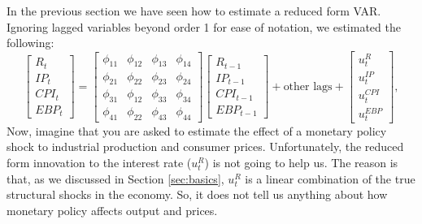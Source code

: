 \documentclass[10pt]{article}
\begin{document}
In the previous section we have seen how to estimate a reduced form VAR.
Ignoring lagged variables beyond order 1 for ease of notation, we estimated
the following:%
\begin{equation}
\begin{bmatrix}
R_{t} \\
IP_{t} \\
CPI_{t} \\
EBP_{t}%
\end{bmatrix}%
=\left[
\begin{array}{cccc}
\phi _{11} & \phi _{12} & \phi _{13} & \phi _{14} \\
\phi _{21} & \phi _{22} & \phi _{23} & \phi _{24} \\
\phi _{31} & \phi _{12} & \phi _{33} & \phi _{34} \\
\phi _{41} & \phi _{22} & \phi _{43} & \phi _{44}%
\end{array}%
\right]
\begin{bmatrix}
R_{t-1} \\
IP_{t-1} \\
CPI_{t-1} \\
EBP_{t-1}%
\end{bmatrix}%
+\text{other lags}+%
\begin{bmatrix}
u_{t}^{R} \\
u_{t}^{IP} \\
u_{t}^{CPI} \\
u_{t}^{EBP}%
\end{bmatrix}%
,
\end{equation}%
Now, imagine that you are asked to estimate the effect of a monetary policy
shock to industrial production and consumer prices. Unfortunately, the
reduced form innovation to the interest rate ($u_{t}^{R}$) is not going to
help us. The reason is that, as we discussed in Section \ref{sec:basics}, $%
u_{t}^{R}$ is a linear combination of the true structural shocks in the
economy. So, it does not tell us anything about how monetary policy affects
output and prices.
\end{document}
